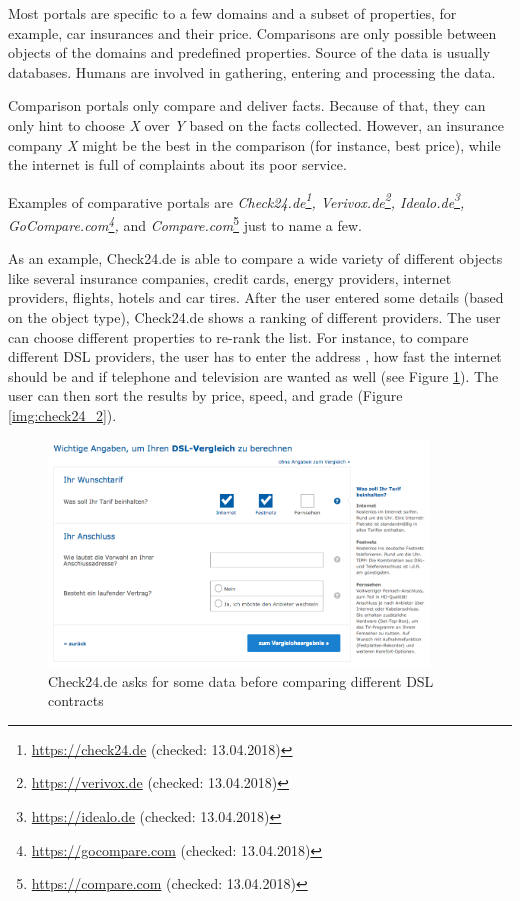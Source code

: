 Most portals are specific to a few domains and a subset of properties, for example, car insurances and their price. Comparisons are only possible between objects of the domains and predefined properties. Source of the data is usually databases. Humans are involved in gathering, entering and processing the data.

Comparison portals only compare and deliver facts. Because of that, they can only hint to choose \emph{X} over \emph{Y} based on the facts collected.  However, an insurance company \emph{X} might be the best in the comparison (for instance, best price), while the internet is full of complaints about its poor service.

Examples of comparative portals are \emph{Check24.de\footnote{\url{https://check24.de} (checked: 13.04.2018)}, Verivox.de\footnote{\url{https://verivox.de} (checked: 13.04.2018)}, Idealo.de\footnote{\url{https://idealo.de} (checked: 13.04.2018)}, GoCompare.com\footnote{\url{https://gocompare.com} (checked: 13.04.2018)},} and \emph{Compare.com}\footnote{\url{https://compare.com} (checked: 13.04.2018)} just to name a few.

As an example, Check24.de is able to compare a wide variety of different objects like several insurance companies, credit cards, energy providers, internet providers, flights, hotels and car tires. After the user entered some details (based on the object type), Check24.de shows a ranking of different providers. The user can choose different properties to re-rank the list.
For instance, to compare different DSL providers, the user has to enter the address , how fast the internet should be and if telephone and television are wanted as well (see Figure \ref{img:check24_1}). The user can then sort the results by price, speed, and grade (Figure \ref{img:check24_2}).
\begin{figure}[tbp]
 \centering
	\includegraphics[width=0.9\textwidth]{images/ds-sys/check24_1}
	\caption{Check24.de asks for some data before comparing different DSL contracts}
		\label{img:check24_1}
\end{figure}

